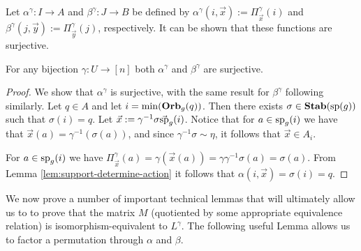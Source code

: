 \documentclass[../paper.tex]{subfiles}
\begin{document}
Let $\alpha^{\gamma}: I \rightarrow A$ and $\beta^{\gamma}: J \rightarrow B$ be
defined by $\alpha^{\gamma} (i, \vec{x}) := \Pi^{\gamma}_{\vec{x}}(i)$ and
$\beta^{\gamma} (j, \vec{y}) := \Pi^{\gamma}_{\vec{y}}(j)$, respectively. It can
be shown that these functions are surjective.

\begin{lem} 
  For any bijection $\gamma : U \rightarrow [n]$ both $\alpha^{\gamma}$ and
  $\beta^{\gamma}$ are surjective.
  \label{lem:alpha-beta-surjective}
\end{lem}
\begin{proof}
  We show that $\alpha^{\gamma}$ is surjective, with the same result for
  $\beta^{\gamma}$ following similarly. Let $q \in A$ and let $i = \min
  (\text{\textbf{Orb}}_{g} (q))$. Then there exists $\sigma \in \text{\textbf{Stab}} (\text{sp} (g))$ such that $\sigma
  (i) = q$. Let $\vec{x} := \gamma^{-1} \sigma \vec{\text{sp}}_g(i)$. Notice that
  for $a \in \text{sp}_g(i)$ we have that $\vec{x}(a) = \gamma^{-1} (\sigma (a))$,
  and since $\gamma^{-1} \sigma \sim \eta$, it follows that $\vec{x} \in A_i$.

  For $a \in \text{sp}_g(i)$ we have $\Pi^{\gamma}_{\vec{x}} (a) = \gamma
  (\vec{x}(a)) = \gamma \gamma^{-1} \sigma (a) = \sigma (a)$. From Lemma
  \ref{lem:support-determine-action} it follows that $\alpha(i, \vec{x}) =
  \sigma(i) = q$.
\end{proof}




We now prove a number of important technical lemmas that will ultimately allow
us to to prove that the matrix $M$ (quotiented by some appropriate equivalence
relation) is isomorphism-equivalent to $L^{\gamma}$. The following useful Lemma
allows us to factor a permutation through $\alpha$ and $\beta$.
\end{document}
